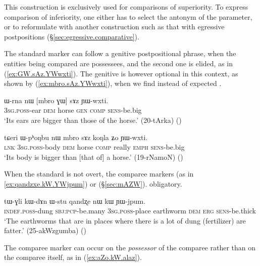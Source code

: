 This construction is exclusively used for comparisons of superiority. To express comparison of inferiority, one either has to select the antonym of the parameter, or to reformulate with another construction such as that with egressive postpositions (§\ref{sec:egressive.comparative}).

The standard marker can follow a genitive postpositional phrase, when the entities being compared are possessees, and the second one is elided, as in (\ref{ex:GW.sAz.YWwxti}). The genitive is however optional in this context, as shown by (\ref{ex:mbro.sAz.YWwxti}), when we find  instead of expected .

\begin{exe}
\ex \label{ex:GW.sAz.YWwxti}
\gll  ɯ-rna nɯ [mbro ɣɯ] sɤz ɲɯ-wxti. \\
\textsc{3sg}.\textsc{poss}-ear \textsc{dem} horse \textsc{gen} \textsc{comp} \textsc{sens}-be.big \\
\glt `Its ears are bigger than those of the horse.' (20-tArka)
()
\end{exe}

\begin{exe}
\ex \label{ex:mbro.sAz.YWwxti}
\gll  tɕeri ɯ-pʰoŋbu nɯ mbro sɤz koŋla ʑo ɲɯ-wxti. \\
\textsc{lnk} \textsc{3sg}.\textsc{poss}-body \textsc{dem} horse \textsc{comp} really \textsc{emph} \textsc{sens}-be.big \\
\glt `Its body is bigger than [that of] a horse.' (19-rNamoN)
()
\end{exe}

When the standard is not overt, the comparee markers  (as in \ref{ex:qandzxe.kW.YWjpum}) or  (§\ref{sec:mAZW}). obligatory.

\begin{exe}
\ex \label{ex:qandzxe.kW.YWjpum}
\gll tɯ-ɣli kɯ-dɤn ɯ-stu qandʐe nɯ kɯ ɲɯ-jpum. \\
\textsc{indef}.\textsc{poss}-dung \textsc{sbj}:\textsc{pcp}-be.many \textsc{3sg}.\textsc{poss}-place earthworm \textsc{dem} \textsc{erg} \textsc{sens}-be.thick \\
\glt `The earthworms that are in places where there is a lot of dung (fertilizer) are fatter.' (25-akWzgumba)
()
\end{exe}

The comparee marker  can occur on the \textit{possessor} of the comparee rather than on the comparee itself, as in (\ref{ex:aZo.kW.alaz}).

